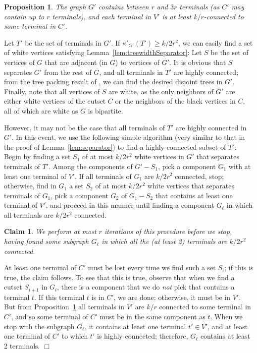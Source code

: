\documentclass[11pt]{article}
\newtheorem{prop}[lemma]{Proposition}
\newtheorem{claim}[lemma]{Claim}
\newcommand{\elconn}{\kappa'}
\renewenvironment{proof}{\vspace{-0.1in}\noindent{\bf Proof:}}{\hspace*{\fill}$\Box$\par}
\begin{document}
\begin{prop}\label{prop:V'Connected}
  The graph $G'$ contains between $r$ and $3r$ terminals (as $C'$ may
  contain up to $r$ terminals), and each terminal in $V'$ is at least
  $k/r$-connected to some terminal in $C'$. 
\end{prop}

Let $T'$ be the set of terminals in $G'$. If $\elconn_{G'}(T') \ge
k/2r^2$, we can easily find a set of white vertices satisfying
Lemma~\ref{lem:treewidthSeparator}: Let $S$ be the set of vertices of
$G$ that are adjacent (in $G$) to vertices of $G'$.  It is obvious
that $S$ separates $G'$ from the rest of $G$, and all terminals in
$T'$ are highly connected; from the tree packing result of \cite{cs},
we can find the desired disjoint trees in $G'$. Finally, note that all
vertices of $S$ are white, as the only neighbors of $G'$ are either
white vertices of the cutset $C$ or the neighbors of the black
vertices in $C$, all of which are white as $G$ is bipartite.

However, it may not be the case that all terminals of $T'$ are highly
connected in $G'$. In this event, we use the following simple
algorithm (very similar to that in the proof of
Lemma~\ref{lem:separator}) to find a highly-connected subset of $T'$:
Begin by finding a set $S_1$ of at most $k/2r^2$ white vertices in
$G'$ that separates terminals of $T'$. Among the components of $G' -
S_1$, pick a component $G_1$ with at least one terminal of $V'$. If
all terminals of $G_1$ are $k/2r^2$ connected, stop; otherwise, find
in $G_1$ a set $S_2$ of at most $k/2r^2$ white vertices that separates
terminals of $G_1$, pick a component $G_2$ of $G_1 - S_2$ that
contains at least one terminal of $V'$, and proceed in this manner
until finding a component $G_\ell$ in which all terminals are $k/2r^2$
connected.

\begin{claim}
  We perform at most $r$ iterations of this procedure before we stop,
  having found some subgraph $G_\ell$ in which all the (at least 2)
  terminals are $k/2r^2$ connected.
\end{claim}
\begin{proof}
  At least one terminal of $C'$ must be lost every time we find such a
  set $S_i$; if this is true, the claim follows. To see that this is
  true, observe that when we find a cutset $S_{i+1}$ in $G_i$, there
  is a component that we do \emph{not} pick that contains a terminal
  $t$. If this terminal $t$ is in $C'$, we are done; otherwise, it
  must be in $V'$. But from Proposition~\ref{prop:V'Connected} all
  terminals in $V'$ are $k/r$ connected to some terminal in $C'$, and
  so some terminal of $C'$ must be in the same component as $t$. When
  we stop with the subgraph $G_\ell$, it contains at least one
  terminal $t' \in V'$, and at least one terminal of $C'$ to which
  $t'$ is highly connected; therefore, $G_\ell$ contains at least 2
  terminals.
\end{proof}
\end{document}
